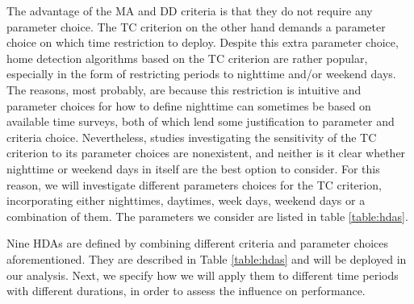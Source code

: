 \documentclass[a4paper]{article}
\begin{document}
The advantage of the MA and DD criteria is that they do not require any parameter choice. The TC criterion on the other hand demands a parameter choice on which time restriction to deploy. Despite this extra parameter choice, home detection algorithms based on the TC criterion are rather popular, especially in the form of restricting periods to nighttime and/or weekend days. The reasons, most probably, are because this restriction is intuitive and parameter choices for how to define nighttime can sometimes be based on available time surveys, both of which lend some justification to parameter and criteria choice. Nevertheless, studies investigating the sensitivity of the TC criterion to its parameter choices are nonexistent, and neither is it clear whether nighttime or weekend days in itself are the best option to consider. For this reason, we will investigate different parameters choices for the TC criterion, incorporating either nighttimes, daytimes, week days, weekend days or a combination of them. The parameters we consider are listed in table \ref{table:hdas}. 


Nine HDAs are defined by combining different criteria and parameter choices aforementioned. They are described in Table \ref{table:hdas} and will be deployed in our analysis. Next, we specify how we will apply them to different time periods with different durations, in order to assess the influence on performance.
\end{document}
